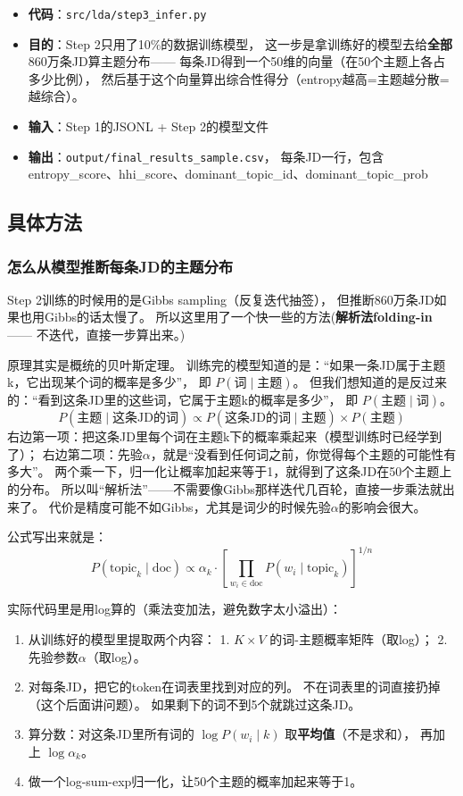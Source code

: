 \documentclass[12pt,a4paper]{ctexart}
\begin{document}
\begin{itemize}[leftmargin=2em]
\item \textbf{代码}：\texttt{src/lda/step3\_infer.py}
\item \textbf{目的}：Step 2只用了10\%的数据训练模型，
这一步是拿训练好的模型去给\textbf{全部}860万条JD算主题分布——
每条JD得到一个50维的向量（在50个主题上各占多少比例），
然后基于这个向量算出综合性得分（entropy越高=主题越分散=越综合）。
\item \textbf{输入}：Step 1的JSONL + Step 2的模型文件
\item \textbf{输出}：\texttt{output/final\_results\_sample.csv}，
每条JD一行，包含 entropy\_score、hhi\_score、dominant\_topic\_id、dominant\_topic\_prob
\end{itemize}

\subsection{具体方法}

\subsubsection{怎么从模型推断每条JD的主题分布}

Step 2训练的时候用的是Gibbs sampling（反复迭代抽签），
但推断860万条JD如果也用Gibbs的话太慢了。
所以这里用了一个快一些的方法(\textbf{解析法folding-in}——
不迭代，直接一步算出来。)

原理其实是概统的贝叶斯定理。
训练完的模型知道的是：``如果一条JD属于主题k，它出现某个词的概率是多少''，
即 $P(\text{词} \mid \text{主题})$。
但我们想知道的是反过来的：``看到这条JD里的这些词，它属于主题k的概率是多少''，
即 $P(\text{主题} \mid \text{词})$。
\[
P(\text{主题} \mid \text{这条JD的词}) \propto
P(\text{这条JD的词} \mid \text{主题}) \times P(\text{主题})
\]
右边第一项：把这条JD里每个词在主题k下的概率乘起来（模型训练时已经学到了）；
右边第二项：先验$\alpha$，就是``没看到任何词之前，你觉得每个主题的可能性有多大''。
两个乘一下，归一化让概率加起来等于1，就得到了这条JD在50个主题上的分布。
所以叫``解析法''——不需要像Gibbs那样迭代几百轮，直接一步乘法就出来了。
代价是精度可能不如Gibbs，尤其是词少的时候先验$\alpha$的影响会很大。

公式写出来就是：
\[
P(\text{topic}_k \mid \text{doc}) \propto \alpha_k \cdot \left[\prod_{w_i \in \text{doc}} P(w_i \mid \text{topic}_k)\right]^{1/n}
\]

实际代码里是用log算的（乘法变加法，避免数字太小溢出）：
\begin{enumerate}
\item 从训练好的模型里提取两个内容：
1. $K \times V$ 的词-主题概率矩阵（取log）； 2. 先验参数$\alpha$（取log）。
\item 对每条JD，把它的token在词表里找到对应的列。
不在词表里的词直接扔掉（这个后面讲问题）。
如果剩下的词不到5个就跳过这条JD。
\item 算分数：对这条JD里所有词的 $\log P(w_i \mid k)$ 取\textbf{平均值}（不是求和），
再加上 $\log \alpha_k$。
\item 做一个log-sum-exp归一化，让50个主题的概率加起来等于1。
\end{enumerate}
\end{document}
